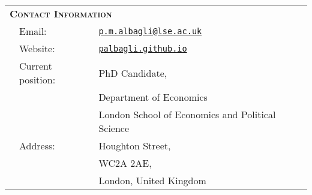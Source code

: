\begin{tabular}{lll}

	\multicolumn{3}{l}{
		\large
		\textbf{%
			\textsc{%
				Contact Information
			}
		}
	}
	\\[2ex]
		
	  \indent
	& Email:
	& \href{mailto:p.m.albagli@lse.ac.uk}{\texttt{p.m.albagli@lse.ac.uk}}
	\\[1ex]
	
	  
	& Website: 
	& \href{https://palbagli.github.io}{\texttt{palbagli.github.io}}
	\\[1ex]
	  
	  
	& Current position:
	& PhD Candidate,
	\\
	&
	& Department of Economics
	\\
	&
	& London School of Economics and Political Science
	\\[1ex]
	
	  
	& Address:
	& Houghton Street,
	\\
	&
	& WC2A 2AE,
	\\
	&
	& London, United Kingdom
	
\end{tabular}